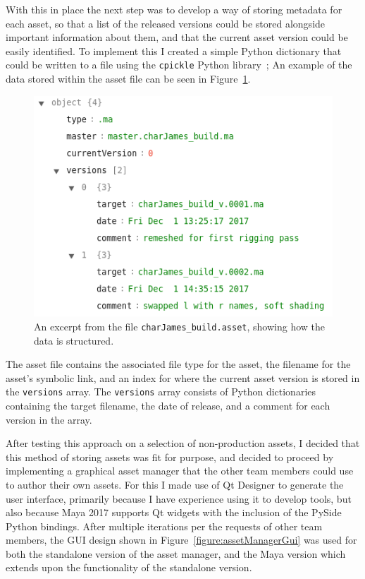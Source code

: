 \documentclass[11pt]{article}
\begin{document}
With this in place the next step was to develop a way of storing metadata for each asset, so that a list of the released versions could be stored alongside important information about them, and that the current asset version could be easily identified. To implement this I created a simple Python dictionary that could be written to a file using the \texttt{cpickle} Python library~\cite{cpickle}; An example of the data stored within the asset file can be seen in Figure~\ref{figure:exampleAsset}.

\begin{figure}[htbp]\centering
	\includegraphics[width=0.8\linewidth]{images/assetExample.png}
	\caption{\label{figure:exampleAsset} An excerpt from the file \texttt{charJames\_build.asset}, showing how the data is structured.}
\end{figure}

The asset file contains the associated file type for the asset, the filename for the asset's symbolic link, and an index for where the current asset version is stored in the \texttt{versions} array. The \texttt{versions} array consists of Python dictionaries containing the target filename, the date of release, and a comment for each version in the array.

After testing this approach on a selection of non-production assets, I decided that this method of storing assets was fit for purpose, and decided to proceed by implementing a graphical asset manager that the other team members could use to author their own assets. For this I made use of Qt Designer to generate the user interface, primarily because I have experience using it to develop tools, but also because Maya 2017 supports Qt widgets with the inclusion of the PySide Python bindings. After multiple iterations per the requests of other team members, the GUI design shown in Figure~\ref{figure:assetManagerGui} was used for both the standalone version of the asset manager, and the Maya version which extends upon the functionality of the standalone version.
\end{document}
